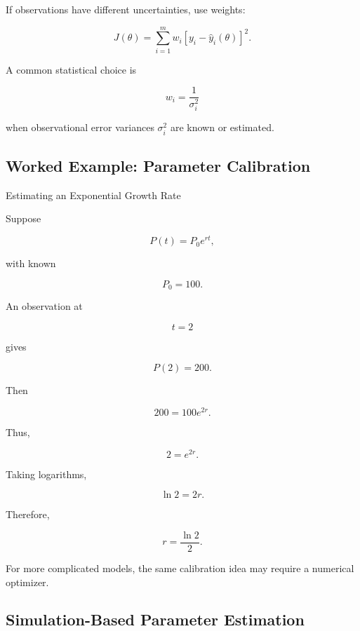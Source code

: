 If observations have different uncertainties, use weights:

\[
\boxed{
J(\theta)
=
\sum_{i=1}^{m}
w_i
\left[
y_i-\widehat{y}_i(\theta)
\right]^2.
}
\]

A common statistical choice is

\[
\boxed{
w_i
=
\frac1{\sigma_i^2}
}
\]

when observational error variances \(\sigma_i^2\) are known or estimated.

\subsection{Worked Example: Parameter Calibration}
\label{subsec:worked-parameter-calibration}

\begin{workedexamplebox}{Estimating an Exponential Growth Rate}

Suppose

\[
P(t)
=
P_0e^{rt},
\]

with known

\[
P_0=100.
\]

An observation at

\[
t=2
\]

gives

\[
P(2)=200.
\]

Then

\[
200
=
100e^{2r}.
\]

Thus,

\[
2=e^{2r}.
\]

Taking logarithms,

\[
\ln2=2r.
\]

Therefore,

\begin{answerbox}
\[
\boxed{
r
=
\frac{\ln2}{2}.
}
\]
\end{answerbox}

For more complicated models, the same calibration idea may require a
numerical optimizer.

\end{workedexamplebox}

\subsection{Simulation-Based Parameter Estimation}
\label{subsec:simulation-based-parameter-estimation}

